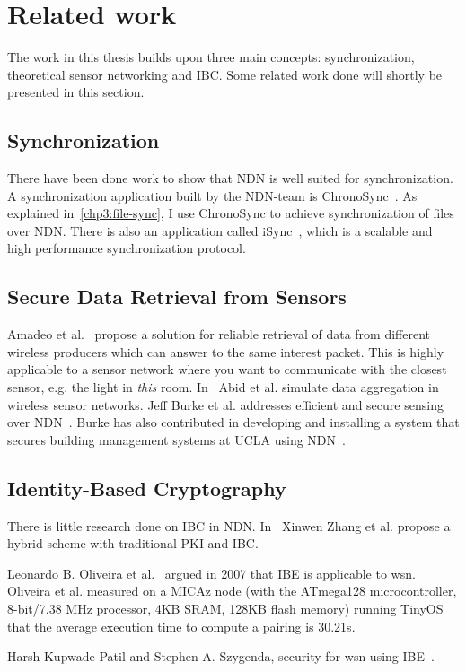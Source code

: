 \section{Related work}
The work in this thesis builds upon three main concepts: synchronization, theoretical sensor networking and \gls{IBC}. 
Some related work done will shortly be presented in this section.

\subsection{Synchronization}
There have been done work to show that \gls{NDN} is well suited for synchronization. 
A synchronization application built by the \gls{NDN}-team is ChronoSync~\cite{DBLP:conf/icnp/ZhuA13}.
As explained in~\autoref{chp3:file-sync}, I use ChronoSync to achieve synchronization of files over \gls{NDN}.
There is also an application called iSync~\cite{DBLP:conf/acmicn/FuAC14}, which is a scalable and high performance synchronization protocol.

\subsection{Secure Data Retrieval from Sensors}
Amadeo et al.~\cite{DBLP:conf/acmicn/AmadeoCM14} propose a solution for reliable retrieval of \gls{data} from different wireless producers which can answer to the same \gls{interest} packet. This is highly applicable to a sensor network where you want to communicate with the closest sensor, e.g. the light in \textit{this} room.
In~\cite{DBLP:conf/noms/AbidySLF14} Abid et al. simulate \gls{data} aggregation in wireless sensor networks.
Jeff Burke et al. addresses efficient and secure sensing over \gls{NDN}~\cite{DBLP:conf/nca/BurkeGNT14}.
Burke has also contributed in developing and installing a system that secures building management systems at \gls{UCLA} using \gls{NDN}~\cite{DBLP:journals/network/ShangDMBZ14}.

\subsection{Identity-Based Cryptography}
There is little research done on \gls{IBC} in \gls{NDN}. 
In~\cite{DBLP:conf/icnp/ZhangCXWSW11} Xinwen Zhang et al. propose a hybrid scheme with traditional \gls{PKI} and \gls{IBC}.

Leonardo B. Oliveira et al.~\cite{DBLP:journals/iacr/OliveiraAMDLD07} argued in 2007 that \gls{IBE} is applicable to \gls{wsn}.
Oliveira et al. measured on a MICAz node (with the ATmega128 microcontroller, 8-bit/7.38 MHz processor, 4KB SRAM, 128KB flash memory) running TinyOS that the average execution time to compute a pairing is 30.21s. 

Harsh Kupwade Patil and Stephen A. Szygenda, security for \gls{wsn} using \gls{IBE}~\cite{Patil:2012:SWS:2464778}.

